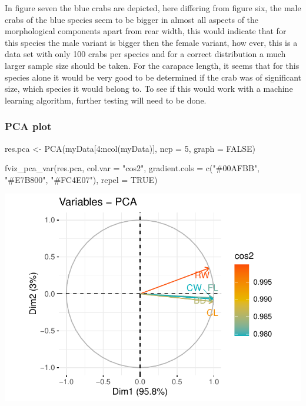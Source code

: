 \documentclass[
]{article}
\newenvironment{Shaded}{}{}
\newcommand{\AttributeTok}[1]{#1}
\newcommand{\ConstantTok}[1]{#1}
\newcommand{\DecValTok}[1]{#1}
\newcommand{\FunctionTok}[1]{#1}
\newcommand{\NormalTok}[1]{#1}
\newcommand{\OtherTok}[1]{\textcolor[rgb]{1.00,0.25,0.00}{#1}}
\newcommand{\SpecialCharTok}[1]{\textcolor[rgb]{0.00,0.50,0.50}{#1}}
\newcommand{\StringTok}[1]{\textcolor[rgb]{0.00,0.50,0.50}{#1}}
\begin{document}
In figure seven the blue crabs are depicted, here differing from figure
six, the male crabs of the blue species seem to be bigger in almost all
aspects of the morphological components apart from rear width, this
would indicate that for this species the male variant is bigger then the
female variant, how ever, this is a data set with only 100 crabs per
species and for a correct distribution a much larger sample size should
be taken. For the carapace length, it seems that for this species alone
it would be very good to be determined if the crab was of significant
size, which species it would belong to. To see if this would work with a
machine learning algorithm, further testing will need to be done.

\hypertarget{pca-plot}{%
\subsubsection{PCA plot}\label{pca-plot}}

\begin{Shaded}
\begin{Highlighting}[]
\NormalTok{res.pca }\OtherTok{\textless{}{-}} \FunctionTok{PCA}\NormalTok{(myData[}\DecValTok{4}\SpecialCharTok{:}\FunctionTok{ncol}\NormalTok{(myData)], }\AttributeTok{ncp =} \DecValTok{5}\NormalTok{, }\AttributeTok{graph =} \ConstantTok{FALSE}\NormalTok{)}

\FunctionTok{fviz\_pca\_var}\NormalTok{(res.pca, }\AttributeTok{col.var =} \StringTok{"cos2"}\NormalTok{,}
             \AttributeTok{gradient.cols =} \FunctionTok{c}\NormalTok{(}\StringTok{"\#00AFBB"}\NormalTok{, }\StringTok{"\#E7B800"}\NormalTok{, }\StringTok{"\#FC4E07"}\NormalTok{), }
             \AttributeTok{repel =} \ConstantTok{TRUE}\NormalTok{)}
\end{Highlighting}
\end{Shaded}

\begin{center}\includegraphics{Log_files/figure-latex/pca-1} \end{center}
\end{document}
